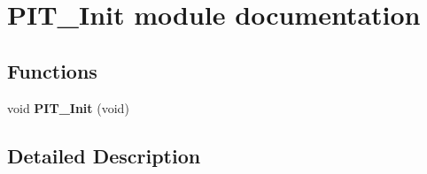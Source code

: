 \hypertarget{group___p_i_t___init__module}{}\section{P\+I\+T\+\_\+\+Init module documentation}
\label{group___p_i_t___init__module}
\subsection*{Functions}
\begin{DoxyCompactItemize}
\item 
void {\bfseries P\+I\+T\+\_\+\+Init} (void)\hypertarget{group___p_i_t___init__module_ga6e7b4f573b259f76958dadeaf50d3238}{}\label{group___p_i_t___init__module_ga6e7b4f573b259f76958dadeaf50d3238}

\end{DoxyCompactItemize}


\subsection{Detailed Description}
